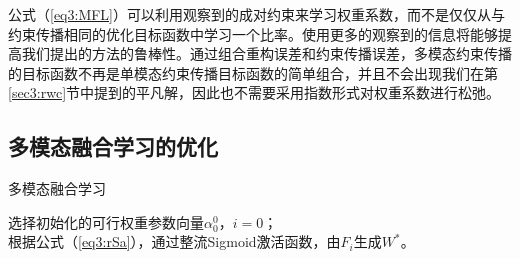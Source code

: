 公式（\ref{eq3:MFL}）可以利用观察到的成对约束来学习权重系数，而不是仅仅从与约束传播相同的优化目标函数中学习一个比率。使用更多的观察到的信息将能够提高我们提出的方法的鲁棒性。通过组合重构误差和约束传播误差，多模态约束传播的目标函数不再是单模态约束传播目标函数的简单组合，并且不会出现我们在第\ref{sec3:rwc}节中提到的平凡解，因此也不需要采用指数形式对权重系数进行松弛。

\subsection{多模态融合学习的优化}
\label{sec3:opt}

\begin{algorithm}[t]
	\caption{多模态融合学习}
	\label{alg3:MFL}
    选择初始化的可行权重参数向量$ {\alpha}^0_0 $，$ i = 0 $；\\
    根据公式（\ref{eq3:rSa}），通过整流Sigmoid激活函数，由$F_i$生成$W^*$。
\end{algorithm}

